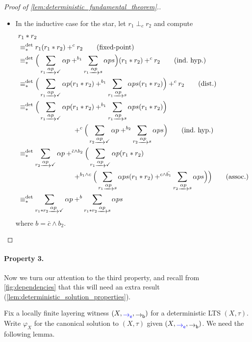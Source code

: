 \documentclass[orivec,envcountsect,envcountsame]{llncs}
\begin{document}
\begin{proof}[Proof of \cref{lem:deterministic_fundamental_theorem}.]
\begin{itemize}
		\item In the inductive case for the star, let \(r_1 \perp_c r_2\) and compute
		\begin{align*}
			&r_1* r_2 \\
			&\equiv_*^{\det} r_1(r_1*r_2) +^c r_2 \tag{fixed-point}\\
			&\equiv_*^{\det}
			\Big(\sum_{r_1 \tr{\alpha  p} \checkmark} \alpha p
			+^{b_1} \sum_{r_1 \tr{\alpha  p} s} \alpha p s\Big) (r_1* r_2) +^c r_2
			\tag{ind.~hyp.}\\
			&\equiv_*^{\det}
			\Big(\sum_{r_1 \tr{\alpha  p} \checkmark} \alpha p(r_1* r_2)
			+^{b_1} \sum_{r_1 \tr{\alpha  p} s} \alpha p s(r_1* r_2)\Big)  +^c r_2
			\tag{dist.}\\
			&\equiv_*^{\det}
			\Big(\sum_{r_1 \tr{\alpha  p} \checkmark} \alpha p(r_1* r_2)
			+^{b_1} \sum_{r_1 \tr{\alpha  p} s} \alpha p s(r_1* r_2)\Big)
			\\&\hspace{8em}+^c \Big(\sum_{r_2 \tr{\alpha  p} \checkmark} \alpha p
			+^{b_2} \sum_{r_2 \tr{\alpha  p} s} \alpha p s\Big)
			\tag{ind.~hyp.} \\
			&\equiv_*^{\det}
			\sum_{r_2 \tr{\alpha  p} \checkmark} \alpha p
			+^{\bar c \wedge b_2}
			\Big(\sum_{r_1 \tr{\alpha  p} \checkmark} \alpha p(r_1* r_2)
			\\&\hspace{8em} +^{b_1\wedge c} \Big(\sum_{r_1 \tr{\alpha  p} s} \alpha p s(r_1* r_2)
			+^{c \wedge \bar{b_1}} \sum_{r_2 \tr{\alpha  p} s} \alpha p s\Big)\Big)
			\tag{assoc.}\\
			&\equiv_*^{\det} \sum_{r_1* r_2 \tr{\alpha  p}\checkmark} \alpha p
			+^{b} \sum_{r_1* r_2 \tr{\alpha  p} s} \alpha p s
		\end{align*}
		where \(b = \bar c \wedge b_2\).
	\end{itemize}
\end{proof}

\paragraph*{Property 3.} Now we turn our attention to the third property, and recall from \cref{fig:dependencies} that this will need an extra result (\cref{lem:deterministic_solution_properties}).

Fix a locally finite layering witness \((X, \eo, \bo)\) for a deterministic LTS \((X,\tau)\).
Write \(\varphi_X\) for the canonical solution to \((X,\tau)\) given \((X, \eo, \bo)\).
We need the following lemma.
\end{document}
